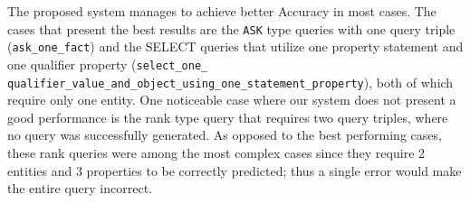 The proposed system manages to achieve better Accuracy in most cases. The cases that present the best 
results are the \texttt{ASK} type queries with one query triple (\texttt{ask\_one\_fact}) and the SELECT queries 
that utilize one property statement and one qualifier property (\texttt{select\_one\_
qualifier\_value\_and\_object\_using\_one\_statement\_property}), both of which require only one entity. One 
noticeable case where our system does not present a good performance is the rank type query that 
requires two query triples, where no query was successfully generated. As opposed to the best 
performing cases, these rank queries were among the most complex cases since they require 2 
entities and 3 properties to be correctly predicted; thus a single error would make the entire 
query incorrect.

